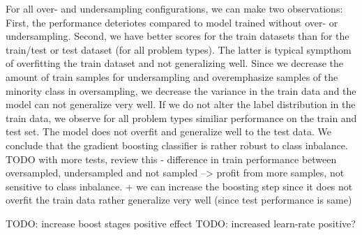 For all over- and undersampling configurations, we can make two observations: First, the performance deteriotes compared to model trained without over- or undersampling. Second, we have better scores for the train datasets than for the train/test or test dataset (for all problem types). The latter is typical sympthom of overfitting the train dataset and not generalizing well. Since we decrease the amount of train samples for undersampling and overemphasize samples of the minority class in oversampling, we decrease the variance in the train data and the model can not generalize very well. If we do not alter the label distribution in the train data, we observe for all problem types similiar performance on the train and test set. The model does not overfit and generalize well to the test data. We conclude that the gradient boosting classifier is rather robust to class inbalance. TODO with more tests, review this - difference in train performance between oversampled, undersampled and not sampled --> profit from more samples, not sensitive to class inbalance. + we can increase the boosting step since it does not overfit the train data rather generalize very well (since test performance is same)

TODO: increase boost stages positive effect
TODO: increased learn-rate positive?



